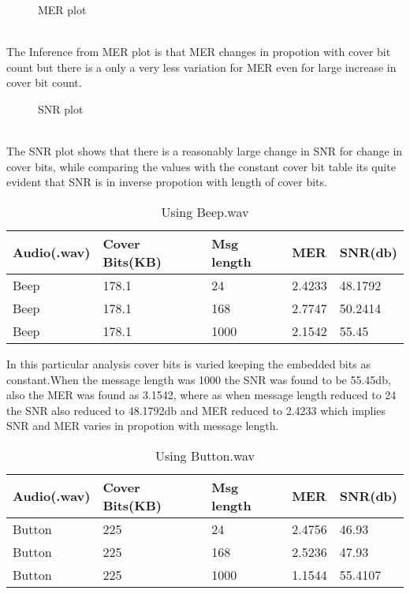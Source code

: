 \documentclass[a4paper, 12pt, notitlepage]{report}
\begin{document}
\begin{figure}[h!]
{\par}
\caption{MER plot}
\end{figure}\\

The Inference from MER plot is that MER changes in propotion with cover bit count but there is a only a very less variation for MER even for large increase in cover bit count.

\begin{figure}[h!]
{\par}
\caption{SNR plot}
\end{figure}\\

The SNR plot shows that there is a reasonably large change in SNR for change in cover bits, while comparing the values with the constant cover bit table its quite evident that SNR is in inverse propotion with length of cover bits. 

\begin{table}[h]
\begin{tabular}{|l|l|l|l|l|}
\hline
\textbf{ Audio(.wav)}&\textbf{Cover Bits(KB)}&\textbf{Msg length}&\textbf{MER}&\textbf{SNR(db)} \\ \hline
 Beep&178.1  &24  &2.4233  &48.1792  \\ \hline
 Beep&178.1  &168  &2.7747  &50.2414  \\ \hline
 Beep&178.1  &1000  &2.1542  &55.45  \\ \hline
\end{tabular}
\caption{Using Beep.wav}
\end{table}

In this particular analysis cover bits is varied keeping the embedded bits as constant.When the message length was 1000 the SNR was found to be 55.45db, also the MER was found as 3.1542, where as when message length reduced to 24 the SNR also reduced to 48.1792db and MER reduced to 2.4233 which implies SNR and MER varies in propotion with message length.  

\begin{table}[h]
\begin{tabular}{|l|l|l|l|l|}
\hline
\textbf{ Audio(.wav)}&\textbf{Cover Bits(KB)}&\textbf{Msg length}&\textbf{MER}&\textbf{SNR(db)} \\ \hline
 Button&225  &24  &2.4756  &46.93  \\ \hline
 Button&225  &168  &2.5236  &47.93  \\ \hline
 Button&225  &1000  &1.1544  &55.4107  \\ \hline
\end{tabular}
\caption{Using Button.wav}
\end{table}
\end{document}
